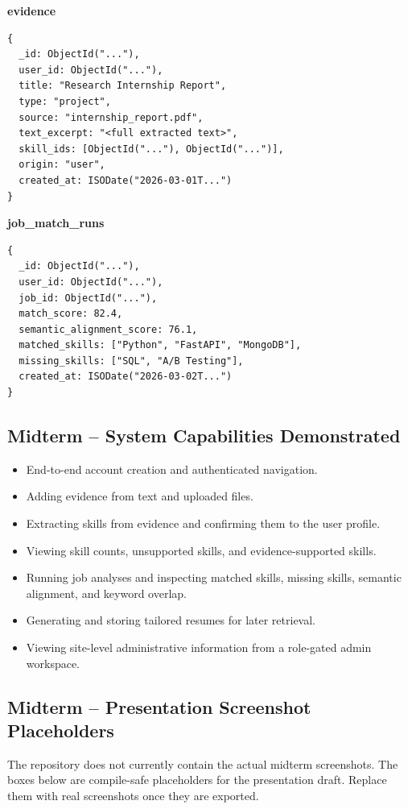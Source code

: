 \documentclass[11pt]{article}
\begin{document}
\noindent
\textbf{evidence}
\begin{verbatim}
{
  _id: ObjectId("..."),
  user_id: ObjectId("..."),
  title: "Research Internship Report",
  type: "project",
  source: "internship_report.pdf",
  text_excerpt: "<full extracted text>",
  skill_ids: [ObjectId("..."), ObjectId("...")],
  origin: "user",
  created_at: ISODate("2026-03-01T...")
}
\end{verbatim}

\noindent
\textbf{job\_match\_runs}
\begin{verbatim}
{
  _id: ObjectId("..."),
  user_id: ObjectId("..."),
  job_id: ObjectId("..."),
  match_score: 82.4,
  semantic_alignment_score: 76.1,
  matched_skills: ["Python", "FastAPI", "MongoDB"],
  missing_skills: ["SQL", "A/B Testing"],
  created_at: ISODate("2026-03-02T...")
}
\end{verbatim}

\subsection*{Midterm -- System Capabilities Demonstrated}
\begin{itemize}
  \item End-to-end account creation and authenticated navigation.
  \item Adding evidence from text and uploaded files.
  \item Extracting skills from evidence and confirming them to the user profile.
  \item Viewing skill counts, unsupported skills, and evidence-supported skills.
  \item Running job analyses and inspecting matched skills, missing skills, semantic alignment, and keyword overlap.
  \item Generating and storing tailored resumes for later retrieval.
  \item Viewing site-level administrative information from a role-gated admin workspace.
\end{itemize}

\subsection*{Midterm -- Presentation Screenshot Placeholders}
\noindent
The repository does not currently contain the actual midterm screenshots. The boxes below are compile-safe placeholders for the presentation draft. Replace them with real screenshots once they are exported.
\end{document}

